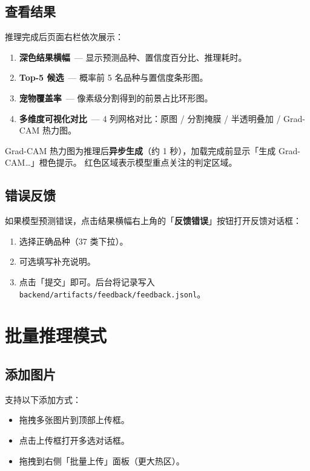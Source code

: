 \documentclass[12pt, a4paper, openany]{ctexbook}
\begin{document}
\subsection{查看结果}

推理完成后页面右栏依次展示：

\begin{enumerate}
  \item \textbf{深色结果横幅}\ — 显示预测品种、置信度百分比、推理耗时。
  \item \textbf{Top-5 候选}\ — 概率前 5 名品种与置信度条形图。
  \item \textbf{宠物覆盖率}\ — 像素级分割得到的前景占比环形图。
  \item \textbf{多维度可视化对比}\ — 4 列网格对比：原图 / 分割掩膜 / 半透明叠加 / Grad-CAM 热力图。
\end{enumerate}

\begin{tipbox}
Grad-CAM 热力图为推理后\textbf{异步生成}（约 1 秒），加载完成前显示「生成 Grad-CAM…」橙色提示。
红色区域表示模型重点关注的判定区域。
\end{tipbox}

\subsection{错误反馈}

如果模型预测错误，点击结果横幅右上角的「\textbf{反馈错误}」按钮打开反馈对话框：

\begin{enumerate}
  \item 选择正确品种（37 类下拉）。
  \item 可选填写补充说明。
  \item 点击「提交」即可。后台将记录写入 \texttt{backend/artifacts/feedback/feedback.jsonl}。
\end{enumerate}

\section{批量推理模式}

\subsection{添加图片}

支持以下添加方式：

\begin{itemize}
  \item 拖拽多张图片到顶部上传框。
  \item 点击上传框打开多选对话框。
  \item 拖拽到右侧「批量上传」面板（更大热区）。
\end{itemize}
\end{document}
